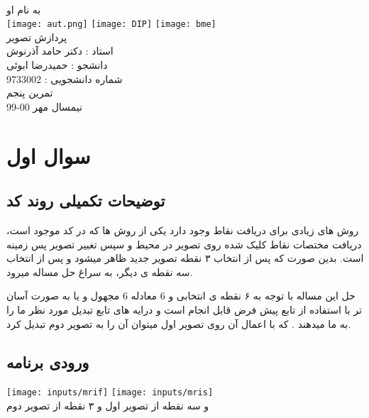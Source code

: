 \documentclass[12pt]{article}
\begin{document}
	\doublespacing
	\begin{titlepage}
		\paragraph*{}
		\centering
			
			
			{\small به نام او}\\
			\vspace{1cm}
			\texttt{[image: aut.png]}
			\hspace{1cm}
			\texttt{[image: DIP]}
			\hspace{1cm}
			\texttt{[image: bme]}\\
			\vspace{2cm}
			{\Huge پردازش تصویر}\\
			\vspace{2cm}
			{\large استاد : دکتر حامد آذرنوش}\\
			\vspace{0.5cm}
			{\small  دانشجو :‌ حمیدرضا ابوئی}\\
			\vspace{0.5cm}
			{\small شماره دانشجویی : 9733002}\\
			\vspace{0.5cm}
			{\small تمرین پنجم}\\
			\vfill
			{\tiny نیمسال مهر 00-99}
	\end{titlepage}
	\thispagestyle{plain}
	\tableofcontents
	\newpage
	\doublespacing
	\section{سوال اول}
		\subsection{توضیحات تکمیلی روند کد}
	روش های زیادی برای دریافت نقاط وجود دارد یکی از روش ها که در کد موجود است، دریافت مختصات نقاط کلیک شده روی تصویر در محیط 
	و سپس تغییر تصویر پس زمینه است.
	بدین صورت که پس از انتخاب ۳ نقطه تصویر جدید ظاهر میشود و پس از انتخاب سه نقطه ی دیگر، به سراغ حل مساله میرود.
	
	حل این مساله با توجه به ۶ نقطه ی انتخابی و 6 معادله 6 مجهول و یا به صورت آسان تر با استفاده از تابع پیش فرض 
	قابل انجام است و درایه های تابع تبدیل مورد نظر ما را به ما میدهند . که با اعمال آن روی تصویر اول میتوان آن را به تصویر دوم تبدیل کرد.
		\subsection{ورودی برنامه}
		\texttt{[image: inputs/mrif]}
		\texttt{[image: inputs/mris]}\\
		و سه نقطه از تصویر اول و ۳ نقطه از تصویر دوم 
\end{document}
